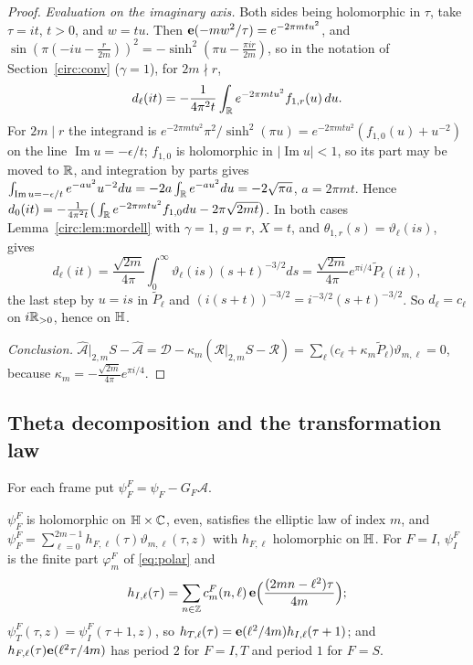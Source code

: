 \begin{proof}
\emph{Evaluation on the imaginary axis.} Both sides being holomorphic in $\tau$, take $\tau=it$, $t>0$, and $w=tu$. Then $\mathbf e(-mw^2/\tau)=e^{-2\pi mtu^2}$, and $\sin(\pi(-iu-\frac r{2m}))^2=-\sinh^2(\pi u-\frac{\pi ir}{2m})$, so in the notation of Section~\ref{circ:conv} ($\gamma=1$), for $2m\nmid r$,
\[
d_\ell(it)=-\frac1{4\pi^2t}\int_{\mathbb{R}} e^{-2\pi mtu^2}f_{1,r}(u)\,du .
\]
For $2m\mid r$ the integrand is $e^{-2\pi mtu^2}\pi^2/\sinh^2(\pi u)=e^{-2\pi mtu^2}(f_{1,0}(u)+u^{-2})$ on the line $\operatorname{Im}u=-\epsilon/t$; $f_{1,0}$ is holomorphic in $|\operatorname{Im}u|<1$, so its part may be moved to $\mathbb{R}$, and integration by parts gives $\int_{\operatorname{Im}u=-\epsilon/t}e^{-au^2}u^{-2}du=-2a\int_{\mathbb{R}} e^{-au^2}du=-2\sqrt{\pi a}$, $a=2\pi mt$. Hence $d_0(it)=-\frac1{4\pi^2t}\big(\int_{\mathbb{R}} e^{-2\pi mtu^2}f_{1,0}du-2\pi\sqrt{2mt}\big)$. In both cases Lemma~\ref{circ:lem:mordell} with $\gamma=1$, $g=r$, $X=t$, and $\theta_{1,r}(s)=\vartheta_\ell(is)$, gives
\[
d_\ell(it)=\frac{\sqrt{2m}}{4\pi}\int_0^\infty\vartheta_\ell(is)(s+t)^{-3/2}ds=\frac{\sqrt{2m}}{4\pi}e^{\pi i/4}\tilde P_\ell(it),
\]
the last step by $u=is$ in $\tilde P_\ell$ and $(i(s+t))^{-3/2}=i^{-3/2}(s+t)^{-3/2}$. So $d_\ell=c_\ell$ on $i\mathbb{R}_{>0}$, hence on $\mathbb{H}$.

\emph{Conclusion.} $\widehat{\mathcal A}|_{2,m}S-\widehat{\mathcal A}=\mathcal D-\kappa_m(\mathcal R|_{2,m}S-\mathcal R)=\sum_\ell\big(c_\ell+\kappa_m\tilde P_\ell\big)\vartheta_{m,\ell}=0$, because $\kappa_m=-\frac{\sqrt{2m}}{4\pi}e^{\pi i/4}$.
\end{proof}

\subsection{Theta decomposition and the transformation law}\label{tr:T2}
For each frame put $\psi^F_F=\psi_F-G_F\mathcal A$.

\begin{lemma}\label{tr:lem:thetadec}
$\psi^F_F$ is holomorphic on $\mathbb{H}\times\mathbb{C}$, even, satisfies the elliptic law of index $m$, and $\psi^F_F=\sum_{\ell=0}^{2m-1}h_{F,\ell}(\tau)\vartheta_{m,\ell}(\tau,z)$ with $h_{F,\ell}$ holomorphic on $\mathbb{H}$. For $F=I$, $\psi^F_I$ is the finite part $\varphi^F_m$ of \eqref{eq:polar} and
\begin{equation}\label{circ:T1}
h_{I,\ell}(\tau)=\sum_{n\in\mathbb{Z}}c^F_m(n,\ell)\,\mathbf e\Big(\frac{(2mn-\ell^2)\tau}{4m}\Big);
\end{equation}
 $\psi^F_T(\tau,z)=\psi^F_I(\tau+1,z)$, so $h_{T,\ell}(\tau)=\mathbf e(\ell^2/4m)h_{I,\ell}(\tau+1)$; and $h_{F,\ell}(\tau)\mathbf e(\ell^2\tau/4m)$ has period $2$ for $F=I,T$ and period $1$ for $F=S$.
\end{lemma}

